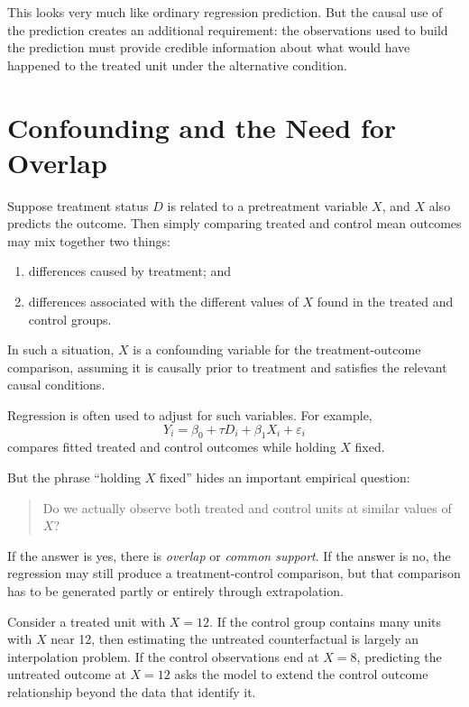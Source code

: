 \documentclass[11pt]{report}
\begin{document}
This looks very much like ordinary regression prediction. But the causal use of the prediction creates an additional requirement: the observations used to build the prediction must provide credible information about what would have happened to the treated unit under the alternative condition.

\section{Confounding and the Need for Overlap}

Suppose treatment status \(D\) is related to a pretreatment variable \(X\), and \(X\) also predicts the outcome. Then simply comparing treated and control mean outcomes may mix together two things:

\begin{enumerate}
    \item differences caused by treatment; and
    \item differences associated with the different values of \(X\) found in the treated and control groups.
\end{enumerate}

In such a situation, \(X\) is a confounding variable for the treatment-outcome comparison, assuming it is causally prior to treatment and satisfies the relevant causal conditions.

Regression is often used to adjust for such variables. For example,
\[
Y_i=\beta_0+\tau D_i+\beta_1X_i+\varepsilon_i
\]
compares fitted treated and control outcomes while holding \(X\) fixed.

But the phrase ``holding \(X\) fixed'' hides an important empirical question:

\begin{quote}
Do we actually observe both treated and control units at similar values of \(X\)?
\end{quote}

If the answer is yes, there is \emph{overlap} or \emph{common support}. If the answer is no, the regression may still produce a treatment-control comparison, but that comparison has to be generated partly or entirely through extrapolation.

Consider a treated unit with \(X=12\). If the control group contains many units with \(X\) near 12, then estimating the untreated counterfactual is largely an interpolation problem. If the control observations end at \(X=8\), predicting the untreated outcome at \(X=12\) asks the model to extend the control outcome relationship beyond the data that identify it.
\end{document}

